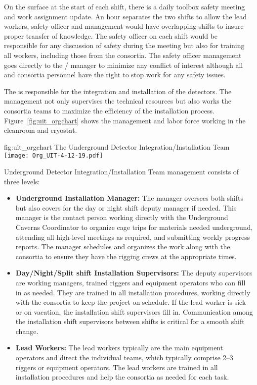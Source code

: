 On the surface at the start of each shift, there is a daily toolbox
safety meeting and work assignment update. An hour separates the two
shifts to allow the lead workers, safety officer and management would
have overlapping shifts to insure proper transfer of knowledge. The
safety officer on each shift would be responsible for any discussion
of safety during the meeting but also for training all workers,
including those from the consortia.  The safety officer management
goes directly to the /  manager to
minimize any conflict of interest although all  and
consortia personnel have the right to stop work for any safety issues.

The  is responsible for the integration and installation of
the  detectors.  The management not only supervises the
technical resources but also works the consortia teams to maximize the
efficiency of the installation process. Figure~\ref{fig:uit_orgchart}
shows the management and labor force working in the cleanroom and
cryostat.
\begin{dunefigure}{fig:uit_orgchart}
  {The Underground Detector Integration/Installation Team}
  \texttt{[image: Org\_UIT-4-12-19.pdf]}
\end{dunefigure}
Underground Detector Integration/Installation Team management consists
of three levels:
\begin{itemize}
  \item {\bf Underground Installation Manager:} The  manager oversees
    both shifts but also covers for the day or night shift deputy
    manager if needed. This  manager is the contact person working
    directly with the Underground Caverns Coordinator to organize cage
    trips for materials needed underground, attending all high-level
    meetings as required, and submitting weekly progress reports. The
     manager schedules and organizes the work along with the
    consortia to ensure they have the rigging crews at the appropriate
    times.
  \item {\bf Day/Night/Split shift Installation Supervisors:} The deputy
    supervisors are working managers, trained riggers and equipment
    operators who can fill in as needed. They are trained in all
    installation procedures, working directly with the consortia to
    keep the project on schedule. If the lead worker is sick or on
    vacation, the installation shift supervisors fill
    in. Communication among the installation shift supervisors between
    shifts is critical for a smooth shift change.
  \item {\bf Lead Workers:} The lead workers typically are the main
    equipment operators and direct the individual teams, which
    typically comprise 2--3 riggers or equipment operators. The lead
    workers are trained in all installation procedures and help the
    consortia as needed for each task.
\end{itemize}
        


